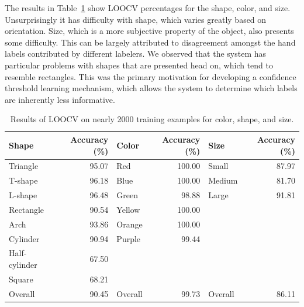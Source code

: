 \documentclass[11pt]{article}
\begin{document}
The results in Table~\ref{tbl:testresults} show LOOCV percentages
for the shape, color, and size. Unsurprisingly it has difficulty with shape,
which varies greatly based on orientation. Size, which is a more subjective
property of the object, also presents some difficulty. This can be largely
attributed to disagreement amongst the hand labels contributed by different
labelers. We observed that the system has particular problems with shapes that
are presented head on, which tend to resemble rectangles.  This was the primary
motivation for developing a confidence threshold learning mechanism, which
allows the system to determine which labels are inherently less informative.

\begin{table}
    \centering
    \begin{tabular}{||l|r||l|r||l|r||}
        \hline
        Shape         & Accuracy (\%) & Color   & Accuracy (\%) & Size &Accuracy (\%) \\ \hline \hline
        Triangle      & 95.07                & Red     & 100.00               & Small   & 87.97               \\ \hline
        T-shape       & 96.18                & Blue    & 100.00               & Medium  &   81.70             \\ \hline
        L-shape       & 96.48                & Green   & 98.88                & Large   & 91.81               \\ \hline
        Rectangle     & 90.54                & Yellow  & 100.00               & ~  &   ~             \\ \hline
        Arch          & 93.86                & Orange  & 100.00               & ~       & ~                   \\ \hline
        Cylinder      & 90.94                & Purple  & 99.44                & ~       & ~                   \\ \hline
        Half-cylinder & 67.50                & ~        & ~                     & ~       & ~                   \\ \hline
        Square        & 68.21                & ~       & ~                      & ~       & ~                   \\ \hline
        Overall       & 90.45                & Overall       & 99.73         & Overall      & 86.11                   \\
        \hline
    \end{tabular}
    \caption{Results of LOOCV on nearly 2000 training examples for color, shape, and size.}
	\label{tbl:testresults}
\end{table}
\end{document}
